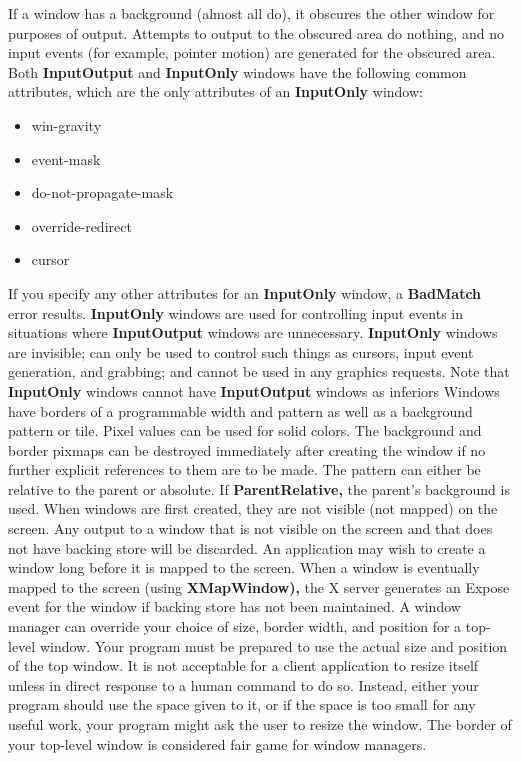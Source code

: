 \documentclass{report}
\begin{document}
\begin{itemize}
            \bigbreak \noindent 
            If a window has a background (almost all do), it obscures the other window for purposes of output. Attempts to output to the obscured area do nothing, and no input events (for example, pointer motion) are generated for the obscured area.
            \bigbreak \noindent 
            Both \textbf{InputOutput} and \textbf{InputOnly} windows have the following common attributes, which are the only attributes of an \textbf{InputOnly} window:
            \begin{itemize}
                \item win-gravity
                \item event-mask
                \item do-not-propagate-mask
                \item override-redirect
                \item cursor
            \end{itemize}
            If you specify any other attributes for an \textbf{InputOnly} window, a \textbf{BadMatch} error results.
            \bigbreak \noindent 
            \textbf{InputOnly} windows are used for controlling input events in situations where \textbf{InputOutput} windows are unnecessary. \textbf{InputOnly} windows are invisible; can only be used to control such things as cursors, input event generation, and grabbing; and cannot be used in any graphics requests. Note that \textbf{InputOnly} windows cannot have \textbf{InputOutput} windows as inferiors
            \bigbreak \noindent 
            Windows have borders of a programmable width and pattern as well as a background pattern or tile. Pixel values can be used for solid colors. The background and border pixmaps can be destroyed immediately after creating the window if no further explicit references to them are to be made. The pattern can either be relative to the parent or absolute. If \textbf{ParentRelative,} the parent’s background is used.
            \bigbreak \noindent 
            When windows are first created, they are not visible (not mapped) on the screen. Any output to a window that is not visible on the screen and that does not have backing store will be discarded. An application may wish to create a window long before it is mapped to the screen. When a window is eventually mapped to the screen (using \textbf{XMapWindow),} the X server generates an Expose event for the window if backing store has not been maintained.
            \bigbreak \noindent 
            A window manager can override your choice of size, border width, and position for a top-level window. Your program must be prepared to use the actual size and position of the top window. It is not acceptable for a client application to resize itself unless in direct response to a human command to do so. Instead, either your program should use the space given to it, or if the space is too small for any useful work, your program might ask the user to resize the window. The border of your top-level window is considered fair game for window managers.

\end{itemize}
\end{document}
